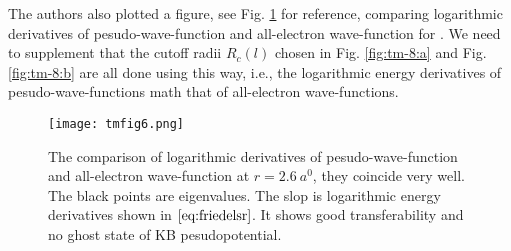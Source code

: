 The authors also plotted a figure,
see Fig. \ref{fig:tmfig6} for reference,
comparing logarithmic derivatives of pesudo-wave-function and all-electron
wave-function for . We need to supplement that the cutoff radii $R_c(l)$
chosen in Fig. \ref{fig:tm-8:a} and Fig. \ref{fig:tm-8:b} are all done using this way,
i.e., the logarithmic energy derivatives of pesudo-wave-functions math that of all-electron wave-functions.
\begin{figure}[H]
	\centering
	\texttt{[image: tmfig6.png]}
	\caption{The comparison of logarithmic derivatives of pesudo-wave-function
		and all-electron wave-function at $r = \SI{2.6}{\bohr}$, they coincide very well. The black points are eigenvalues.
		The slop is logarithmic energy derivatives shown in $\eqref{eq:friedelsr}$.
		It shows good transferability and no ghost state of KB pesudopotential.}
	\label{fig:tmfig6}
\end{figure}